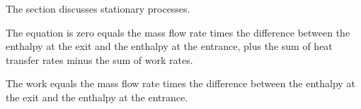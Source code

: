The section discusses stationary processes.

The equation is zero equals the mass flow rate times the difference between the enthalpy at the exit and the enthalpy at the entrance, plus the sum of heat transfer rates minus the sum of work rates.

The work equals the mass flow rate times the difference between the enthalpy at the exit and the enthalpy at the entrance.